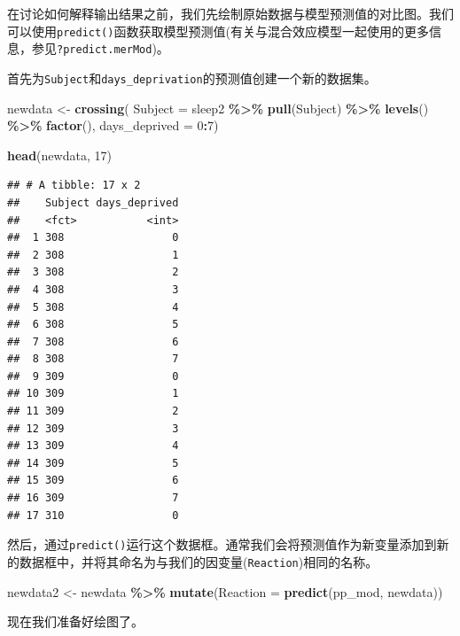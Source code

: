 \documentclass[
]{book}
\newenvironment{Shaded}{\begin{snugshade}}{\end{snugshade}}
\newcommand{\AttributeTok}[1]{\textcolor[rgb]{0.13,0.29,0.53}{#1}}
\newcommand{\DecValTok}[1]{\textcolor[rgb]{0.00,0.00,0.81}{#1}}
\newcommand{\FunctionTok}[1]{\textcolor[rgb]{0.13,0.29,0.53}{\textbf{#1}}}
\newcommand{\NormalTok}[1]{#1}
\newcommand{\OtherTok}[1]{\textcolor[rgb]{0.56,0.35,0.01}{#1}}
\newcommand{\SpecialCharTok}[1]{\textcolor[rgb]{0.81,0.36,0.00}{\textbf{#1}}}
\begin{document}
在讨论如何解释输出结果之前，我们先绘制原始数据与模型预测值的对比图。我们可以使用\texttt{predict()}函数获取模型预测值(有关与混合效应模型一起使用的更多信息，参见\texttt{?predict.merMod})。

首先为\texttt{Subject}和\texttt{days\_deprivation}的预测值创建一个新的数据集。

\begin{Shaded}
\begin{Highlighting}[]
\NormalTok{newdata }\OtherTok{\textless{}{-}} \FunctionTok{crossing}\NormalTok{(}
  \AttributeTok{Subject =}\NormalTok{ sleep2 }\SpecialCharTok{\%\textgreater{}\%} \FunctionTok{pull}\NormalTok{(Subject) }\SpecialCharTok{\%\textgreater{}\%} \FunctionTok{levels}\NormalTok{() }\SpecialCharTok{\%\textgreater{}\%} \FunctionTok{factor}\NormalTok{(),}
  \AttributeTok{days\_deprived =} \DecValTok{0}\SpecialCharTok{:}\DecValTok{7}\NormalTok{)}

\FunctionTok{head}\NormalTok{(newdata, }\DecValTok{17}\NormalTok{)}
\end{Highlighting}
\end{Shaded}

\begin{verbatim}
## # A tibble: 17 x 2
##    Subject days_deprived
##    <fct>           <int>
##  1 308                 0
##  2 308                 1
##  3 308                 2
##  4 308                 3
##  5 308                 4
##  6 308                 5
##  7 308                 6
##  8 308                 7
##  9 309                 0
## 10 309                 1
## 11 309                 2
## 12 309                 3
## 13 309                 4
## 14 309                 5
## 15 309                 6
## 16 309                 7
## 17 310                 0
\end{verbatim}

然后，通过\texttt{predict()}运行这个数据框。通常我们会将预测值作为新变量添加到新的数据框中，并将其命名为与我们的因变量(\texttt{Reaction})相同的名称。

\begin{Shaded}
\begin{Highlighting}[]
\NormalTok{newdata2 }\OtherTok{\textless{}{-}}\NormalTok{ newdata }\SpecialCharTok{\%\textgreater{}\%}
  \FunctionTok{mutate}\NormalTok{(}\AttributeTok{Reaction =} \FunctionTok{predict}\NormalTok{(pp\_mod, newdata))}
\end{Highlighting}
\end{Shaded}

现在我们准备好绘图了。
\end{document}
